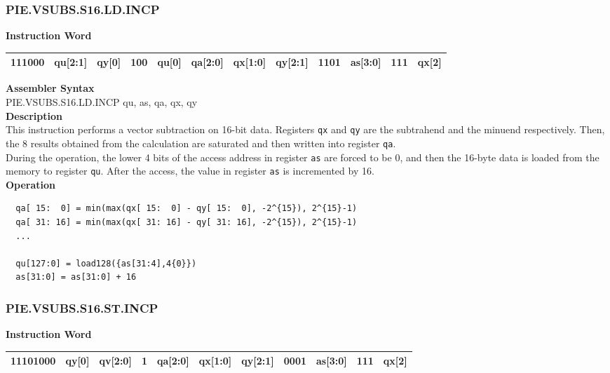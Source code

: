\newpage
\subsubsection{PIE.VSUBS.S16.LD.INCP}\label{instruction:PIEVSUBSS16LDINCP}
\setlength\tabcolsep{6pt}
\textbf{Instruction Word} \\
\begin{tabular}{|c|c|c|c|c|c|c|c|c|c|c|c|}
	\hline
	111000 & qu[2:1] & qy[0] & 100 & qu[0] & qa[2:0] & qx[1:0] & qy[2:1] & 1101 & as[3:0] & 111 & qx[2] \\
	\hline
\end{tabular}

\textbf{Assembler Syntax} \\
PIE.VSUBS.S16.LD.INCP qu, as, qa, qx, qy \\
\textbf{Description} \\
This instruction performs a vector subtraction on 16-bit data. Registers \lstinline{qx} and \lstinline{qy} are the subtrahend and the minuend respectively. Then, the 8 results obtained from the calculation are saturated and then written into register \lstinline{qa}. \\ During the operation, the lower 4 bits of the access address in register \lstinline{as} are forced to be 0, and then the 16-byte data is loaded from the memory to register \lstinline{qu}. After the access, the value in register \lstinline{as} is incremented by 16.\\
\textbf{Operation}
\begin{lstlisting}
  qa[ 15:  0] = min(max(qx[ 15:  0] - qy[ 15:  0], -2^{15}), 2^{15}-1)
  qa[ 31: 16] = min(max(qx[ 31: 16] - qy[ 31: 16], -2^{15}), 2^{15}-1)
  ...

  qu[127:0] = load128({as[31:4],4{0}})
  as[31:0] = as[31:0] + 16
\end{lstlisting}

\newpage
\subsubsection{PIE.VSUBS.S16.ST.INCP}\label{instruction:PIEVSUBSS16STINCP}
\setlength\tabcolsep{6pt}
\textbf{Instruction Word} \\
\begin{tabular}{|c|c|c|c|c|c|c|c|c|c|c|}
	\hline
	11101000 & qy[0] & qv[2:0] & 1 & qa[2:0] & qx[1:0] & qy[2:1] & 0001 & as[3:0] & 111 & qx[2] \\
	\hline
\end{tabular}

